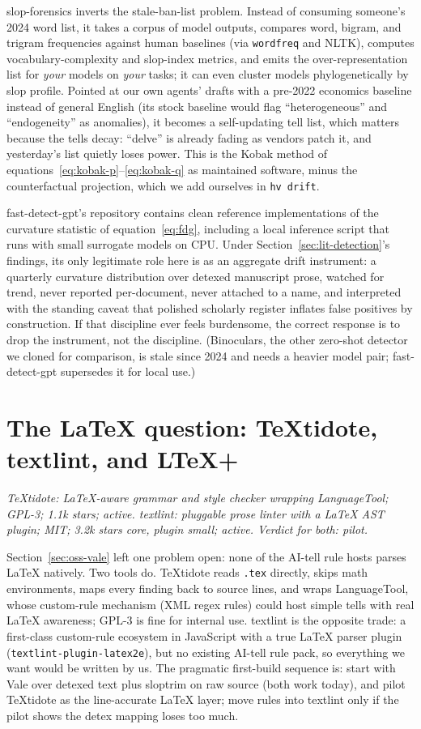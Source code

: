 slop-forensics inverts the stale-ban-list problem. Instead of consuming
someone's 2024 word list, it takes a corpus of model outputs, compares
word, bigram, and trigram frequencies against human baselines (via
\texttt{wordfreq} and NLTK), computes vocabulary-complexity and slop-index
metrics, and emits the over-representation list for \emph{your} models on
\emph{your} tasks; it can even cluster models phylogenetically by slop
profile. Pointed at our own agents' drafts with a pre-2022 economics
baseline instead of general English (its stock baseline would flag
``heterogeneous'' and ``endogeneity'' as anomalies), it becomes a
self-updating tell list, which matters because the tells decay: ``delve''
is already fading as vendors patch it, and yesterday's list quietly loses
power. This is the Kobak method of
equations~\eqref{eq:kobak-p}--\eqref{eq:kobak-q} as maintained software,
minus the counterfactual projection, which we add ourselves in \texttt{hv
drift}.

fast-detect-gpt's repository contains clean reference implementations of
the curvature statistic of equation~\eqref{eq:fdg}, including a local
inference script that runs with small surrogate models on CPU. Under
Section~\ref{sec:lit-detection}'s findings, its only legitimate role here
is as an aggregate drift instrument: a quarterly curvature distribution
over detexed manuscript prose, watched for trend, never reported
per-document, never attached to a name, and interpreted with the standing
caveat that polished scholarly register inflates false positives by
construction. If that discipline ever feels burdensome, the correct
response is to drop the instrument, not the discipline. (Binoculars, the
other zero-shot detector we cloned for comparison, is stale since 2024 and
needs a heavier model pair; fast-detect-gpt supersedes it for local use.)

\section{The LaTeX question: TeXtidote, textlint, and LTeX+}
\label{sec:oss-latex}

\emph{TeXtidote: LaTeX-aware grammar and style checker wrapping
LanguageTool; GPL-3; 1.1k stars; active. textlint: pluggable prose linter
with a LaTeX AST plugin; MIT; 3.2k stars core, plugin small; active.
Verdict for both: pilot.}

Section~\ref{sec:oss-vale} left one problem open: none of the AI-tell rule
hosts parses LaTeX natively. Two tools do. TeXtidote reads \texttt{.tex}
directly, skips math environments, maps every finding back to source
lines, and wraps LanguageTool, whose custom-rule mechanism (XML regex
rules) could host simple tells with real LaTeX awareness; GPL-3 is fine
for internal use. textlint is the opposite trade: a first-class custom-rule
ecosystem in JavaScript with a true LaTeX parser plugin
(\texttt{textlint-plugin-latex2e}), but no existing AI-tell rule pack, so
everything we want would be written by us. The pragmatic first-build sequence is:
start with Vale over detexed text plus sloptrim on raw source (both work
today), and pilot TeXtidote as the line-accurate LaTeX layer; move rules
into textlint only if the pilot shows the detex mapping loses too much.

